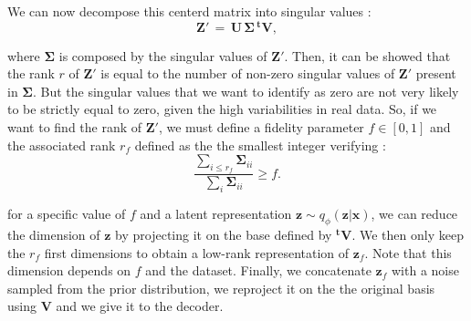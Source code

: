 \documentclass{article}
\begin{document}
We can now decompose this centerd matrix into singular values :
\begin{equation}
    \textbf{Z}'\,=\, \textbf{U}\, \bm\Sigma \,^{\textbf{t}}\textbf{V},
\end{equation}

where $\bm\Sigma$ is composed by the singular values of $\textbf{Z}'$.
Then, it can be showed that the rank $r$ of $\textbf{Z}'$ is equal to the number of non-zero singular values of $\textbf{Z}'$ present in $\bm\Sigma$. But the singular values that we want to identify as zero are not very likely to be strictly equal to zero, given the high variabilities in real data. So, if we want to find the rank of $\textbf{Z}'$, we must define a fidelity parameter $f \in [0,1]$ and the associated rank $r_f$ defined as the the smallest integer verifying :
\begin{equation}
    \frac{\sum_{i \leq r_f} \bm\Sigma_{ii}}{\sum_i \bm\Sigma_{ii}} \geq f.
\end{equation}

for a specific value of $f$ and a latent representation $\textbf{z} \sim q_\phi (\textbf{z}|\textbf{x})$, we can reduce the dimension of $\textbf{z}$ by projecting it on the base defined by $^\textbf{t}\textbf{V}$. We then only keep the $r_f$ first dimensions to obtain a low-rank representation of $\textbf{z}_f$. Note that this dimension depends on $f$ and the dataset. Finally, we concatenate $\textbf{z}_f$ with a noise sampled from the prior distribution, we reproject it on the the original basis using $\textbf{V}$ and we give it to the decoder.
\end{document}

